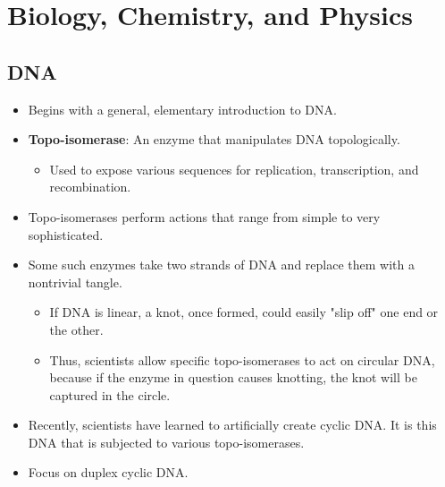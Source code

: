 \documentclass[titlepage]{article}
\numberwithin{figure}{section}
\numberwithin{table}{section}
\numberwithin{equation}{section}
\begin{document}
\section{Biology, Chemistry, and Physics}\label{sse:biochemphys}
\subsection{DNA}
\begin{itemize}
    \item Begins with a general, elementary introduction to DNA.
    \item \textbf{Topo-isomerase}: An enzyme that manipulates DNA topologically.
    \begin{itemize}
        \item Used to expose various sequences for replication, transcription, and recombination.
    \end{itemize}
    \item Topo-isomerases perform actions that range from simple to very sophisticated.
    \item Some such enzymes take two strands of DNA and replace them with a nontrivial tangle.
    \begin{itemize}
        \item If DNA is linear, a knot, once formed, could easily "slip off" one end or the other.
        \item Thus, scientists allow specific topo-isomerases to act on circular DNA, because if the enzyme in question causes knotting, the knot will be captured in the circle.
    \end{itemize}
    \item Recently, scientists have learned to artificially create cyclic DNA. It is this DNA that is subjected to various topo-isomerases.
    \item Focus on duplex cyclic DNA.
    \begin{figure}[h!]
        \centering
        \vspace{2.3em}
\end{figure}
\end{itemize}
\end{document}
